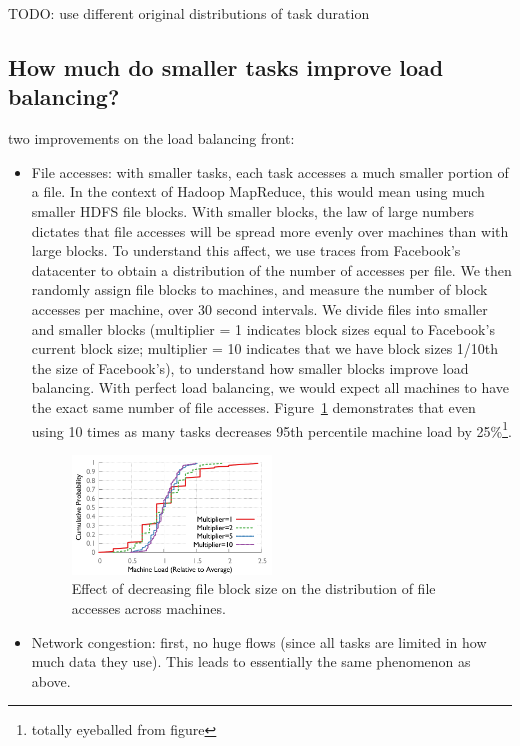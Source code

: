TODO: use different original distributions of task duration

\subsection{How much do smaller tasks improve load balancing?}
two improvements on the load balancing front:
\begin{itemize}
\item File accesses: with smaller tasks, each task accesses a much smaller portion of a file.  In the context of Hadoop MapReduce, this would mean using much smaller HDFS file blocks.  With smaller blocks, the law of large numbers dictates that file accesses will be spread more evenly over machines than with large blocks.  To understand this affect, we use traces from Facebook's datacenter to obtain a distribution of the number of accesses per file.  We then randomly assign file blocks to machines, and measure the number of block accesses per machine, over 30 second intervals.  We divide files into smaller and smaller blocks (multiplier = 1 indicates block sizes equal to Facebook's current block size; multiplier = 10 indicates that we have block sizes 1/10th the size of Facebook's), to understand how smaller blocks improve load balancing.  With perfect load balancing, we would expect all machines to have the exact same number of file accesses.  Figure~\ref{fig:data_skew} demonstrates that even using 10 times as many tasks decreases 95th percentile machine load by 25\%\footnote{totally eyeballed from figure}.  

\begin{figure}[t]
\centering
\vspace{-10ex}
\includegraphics[width=0.5\textwidth]{figures/skew_results}
\vspace{-4ex}
\caption{Effect of decreasing file block size on the distribution of file accesses across machines.}
\vspace{-2ex}
\label{fig:data_skew}
\end{figure}

\item Network congestion: first, no huge flows (since all tasks are limited in how much data they use). This leads to essentially the same phenomenon as above.
\end{itemize}

